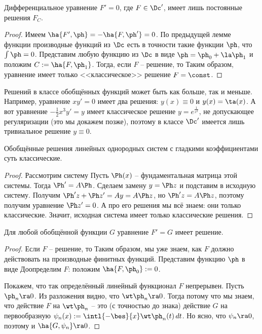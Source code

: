 \documentclass[a4paper]{article}
\newcommand{\dt}{\,dt}
\begin{document}
\begin{theorem}
Дифференциальное уравнение $F' = 0$, где $F\in \Dc'$, имеет лишь постоянные решения $F_C$.
\end{theorem}
\begin{proof}
Имеем $\ha{F',\ph} = -\ha{F,\ph'}=0$. По предыдущей лемме функции производные функций из $\Dc$ есть в точности такие
функции $\ph$, что $\int\ph =0$. Представим любую функцию из $\Dc$ в виде $\ph = \ph_0 + \la \ph_1$ и положим
$C := \ha{F,\ph_1}$. Тогда, если $F$ -- решение, то
Таким образом, уравнение имеет только <<классическое>> решение $F= \const$.
\end{proof}

\begin{note}
Решений в классе обобщённых функций может быть как больше, так и меньше.
Например, уравнение $xy'=0$ имеет два решения: $y(x)\equiv 0$ и $y(x)=\ta(x)$. А вот уравнение $-\frac12x^3 y'=y$
имеет классическое решение $y = e^{\frac{1}{x^2}}$, не допускающее регуляризации (это мы докажем позже), поэтому
в классе $\Dc'$ имеется лишь тривиальное решение $y\equiv0$.
\end{note}


\begin{lemma}
Обобщённые решения линейных однородных систем с гладкими коэффициентами суть классические.
\end{lemma}
\begin{proof}
Рассмотрим систему
Пусть $\Ph(x)$ -- фундаментальная матрица этой системы. Тогда $\Ph' = A\Ph$.
Сделаем замену $y = \Ph z$ и подставим в исходную систему. Получим
$\Ph' z + \Ph z' = Ay = A\Ph z$, но $\Ph'z = A\Ph z$, поэтому получим уравнение $\Ph z' = 0$.
А про его решения мы всё знаем: они только классические. Значит, исходная система имеет только
классические решения.
\end{proof}


\begin{theorem}
Для любой обобщённой функции $G$ уравнение $F' = G$ имеет решение.
\end{theorem}
\begin{proof}
Если $F$ -- решение, то
Таким образом, мы уже знаем, как $F$ должно действовать на производные финитных функций.
Представим функцию $\ph$ в виде
Доопределим $F$: положим $\ha{F,\ph_0} := 0$.

Покажем, что так определённый линейный функционал $F$
непрерывен. Пусть $\ph_n \ra 0$. Из разложения
видно, что $\wt\ph_n \ra 0$. Тогда
потому что мы знаем, что действие $F$ на $\wt\ph_n$ -- это (с точностью до знака)
действие $G$ на первообразную $\psi_n(x) := \intl{-\bes}{x}\wt\ph_n(t)\dt$. Но ясно, что
$\psi_n \ra 0$, поэтому и $\ha{G,\psi_n} \ra 0$.
\end{proof}
\end{document}
